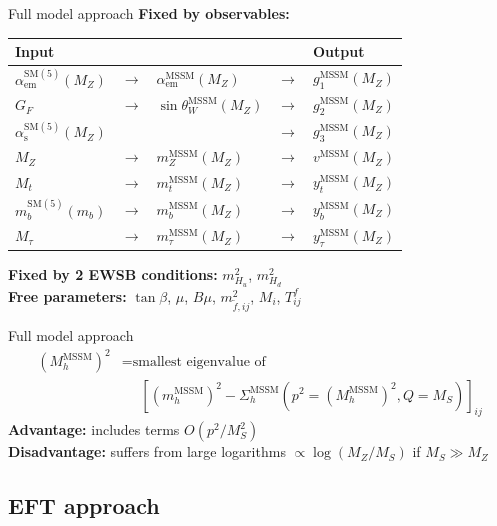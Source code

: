 \documentclass[hyperref={pdfpagelabels=false},ngerman]{beamer}
\renewcommand{\emph}{\textbf}
\newcommand{\SM}{\ensuremath{\text{SM}}}
\newcommand{\MSSM}{\ensuremath{\text{MSSM}}}
\begin{document}
\begin{frame}{Full model approach}
  \emph{Fixed by observables:}
  \begin{table}
    \centering
    \begin{tabular}{lllll}
      Input & & & & Output \\
      \midrule
      $\alpha_\text{em}^{\SM(5)}(M_Z)$ & $\rightarrow$ & $\alpha_\text{em}^\MSSM(M_Z)$ & $\rightarrow$ & $g_1^\MSSM(M_Z)$ \\
      $G_F$ & $\rightarrow$ & $\sin\theta_W^\MSSM(M_Z)$ & $\rightarrow$ & $g_2^\MSSM(M_Z)$ \\
      $\alpha_\text{s}^{\SM(5)}(M_Z)$ & & & $\rightarrow$ & $g_3^\MSSM(M_Z)$ \\
      $M_Z$ & $\rightarrow$ & $m_Z^\MSSM(M_Z)$ & $\rightarrow$ & $v^\MSSM(M_Z)$ \\
      $M_t$ & $\rightarrow$ & $m_t^\MSSM(M_Z)$ & $\rightarrow$ & $y_t^\MSSM(M_Z)$ \\
      $m_b^{\SM(5)}(m_b)$ & $\rightarrow$ & $m_b^\MSSM(M_Z)$ & $\rightarrow$ & $y_b^\MSSM(M_Z)$ \\
      $M_\tau$ & $\rightarrow$ & $m_\tau^\MSSM(M_Z)$ & $\rightarrow$ & $y_\tau^\MSSM(M_Z)$ \\
    \end{tabular}
  \end{table}
  \emph{Fixed by 2 EWSB conditions:} $m^2_{H_u}$, $m^2_{H_d}$ \\[1em]
  \emph{Free parameters:} $\tan\beta$, $\mu$, $B\mu$, $m_{\tilde{f},ij}^2$, $M_i$,
  $T^f_{ij}$
\end{frame}

\begin{frame}{Full model approach}
  \begin{align*}
    (M_h^\text{MSSM})^2 &= \text{smallest eigenvalue of} \\
    &\phantom{={}} \left[(m_h^\text{MSSM})^2 - \Sigma^\text{MSSM}_h(p^2 = (M_h^\text{MSSM})^2,Q = M_S)\right]_{ij}
  \end{align*}
  \emph{Advantage:} includes terms $O(p^2/M_S^2)$\\
  \emph{Disadvantage:} suffers from large logarithms $\propto\log(M_Z/M_S)$ if $M_S\gg M_Z$\\
\end{frame}


\subsection{EFT approach}
\end{document}

